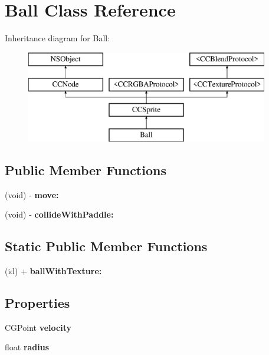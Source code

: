 \hypertarget{interface_ball}{\section{Ball Class Reference}
\label{interface_ball}
}
Inheritance diagram for Ball\-:\begin{figure}[H]
\begin{center}
\leavevmode
\includegraphics[height=4.000000cm]{interface_ball}
\end{center}
\end{figure}
\subsection*{Public Member Functions}
\begin{DoxyCompactItemize}
\item 
\hypertarget{interface_ball_af034260bbfd0cb4b997e01130067bd1a}{(void) -\/ {\bfseries move\-:}}\label{interface_ball_af034260bbfd0cb4b997e01130067bd1a}

\item 
\hypertarget{interface_ball_a1e1e9c4f9bbfbf787c2639ac630406b3}{(void) -\/ {\bfseries collide\-With\-Paddle\-:}}\label{interface_ball_a1e1e9c4f9bbfbf787c2639ac630406b3}

\end{DoxyCompactItemize}
\subsection*{Static Public Member Functions}
\begin{DoxyCompactItemize}
\item 
\hypertarget{interface_ball_ab96c559596dc0eafa30a9730c9b65f56}{(id) + {\bfseries ball\-With\-Texture\-:}}\label{interface_ball_ab96c559596dc0eafa30a9730c9b65f56}

\end{DoxyCompactItemize}
\subsection*{Properties}
\begin{DoxyCompactItemize}
\item 
\hypertarget{interface_ball_aba53389f43bbb0c104c441bb4cb1d892}{C\-G\-Point {\bfseries velocity}}\label{interface_ball_aba53389f43bbb0c104c441bb4cb1d892}

\item 
\hypertarget{interface_ball_a86bfb032007c736e06c2295a8070d620}{float {\bfseries radius}}\label{interface_ball_a86bfb032007c736e06c2295a8070d620}

\end{DoxyCompactItemize}


